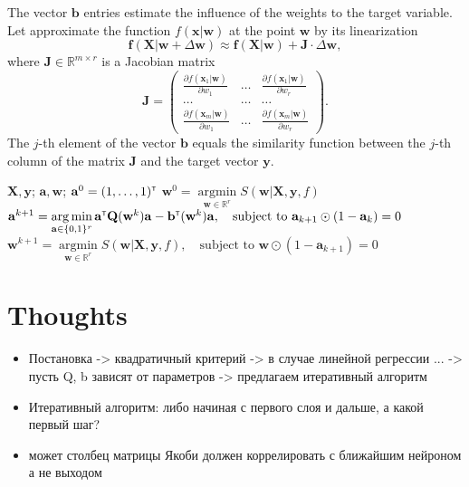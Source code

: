 \documentclass[a4paper,12pt]{article}
\theoremstyle{plain} %
\theoremstyle{definition} %
\theoremstyle{remark} %
\newcommand{\ba}{\mathbf{a}}
\newcommand{\bb}{\mathbf{b}}
\newcommand{\bw}{\mathbf{w}}
\newcommand{\bQ}{\mathbf{Q}}
\newcommand{\by}{\mathbf{y}}
\newcommand{\bx}{\mathbf{x}}
\newcommand{\bX}{\mathbf{X}}
\newcommand{\bbR}{\mathbb{R}}
\newcommand{\T}{{\text{\tiny\sffamily\upshape\mdseries T}}}
\newcommand{\argmin}{\mathop{\arg \min}\limits}
\begin{document}
	\hrulefill
	
	The vector $\bb$ entries estimate the influence of the weights to the target variable. Let approximate the function $f(\bx | \bw)$ at the point $\bw$ by its linearization
	\begin{equation}
		\mathbf{f} (\bX | \bw + \Delta \bw) \approx \mathbf{f}(\bX | \bw) + \mathbf{J} \cdot \Delta \bw,
	\end{equation}
	where $\mathbf{J} \in \bbR^{m \times r}$ is a Jacobian matrix
	\begin{equation}
		\mathbf{J} = 
		\begin{pmatrix}
			\frac{\partial f(\bx_1 | \bw)}{\partial w_1} & \dots & 
			\frac{\partial f(\bx_1 | \bw)}{\partial w_r} \\
			\dots & \dots & \dots \\
			\frac{\partial f(\bx_m | \bw)}{\partial w_1} & \dots & 
			\frac{\partial f(\bx_m | \bw)}{\partial w_r}
		\end{pmatrix}.
	\end{equation}
	The $j$-th element of the vector $\bb$ equals the similarity function between the $j$-th column of the matrix $\mathbf{J}$ and the target vector $\by$.
	
	\begin{algorithm}[h]
		\caption{}
		\begin{algorithmic}[1]
			\REQUIRE $\bX, \by$;
			\ENSURE $\ba, \bw$;
			\STATE $\ba^0 = (1, \dots, 1)^{\T}$
			\STATE $\bw^0 = \argmin_{\bw \in \bbR^r} S(\bw | \bX, \by, f)$
			\STATE $\ba^{k+1} = \argmin_{\ba \in \{0,1\}^r} \ba^{\T} \bQ(\bw^k) \ba - \bb^{\T}(\bw^k) \ba, \quad \text{subject to } \ba_{k+1} \odot (1 - \ba_k) = 0$
			\STATE $\bw^{k+1} = \argmin_{\bw \in \bbR^r} S(\bw | \bX, \by, f), \quad \text{subject to } \bw \odot (1 - \ba_{k + 1}) = 0$
			\ENDFOR
		\end{algorithmic}
	\end{algorithm}

	
	\section{Thoughts}
	\begin{itemize}
		\item Постановка -> квадратичный критерий -> в случае линейной регрессии ... -> пусть Q, b зависят от параметров -> предлагаем итеративный алгоритм 
		\item Итеративный алгоритм: либо начиная с первого слоя и дальше, а какой первый шаг?
		\item может столбец матрицы Якоби должен коррелировать с ближайшим нейроном а не выходом
		
	\end{itemize}
	
	
\end{document}
